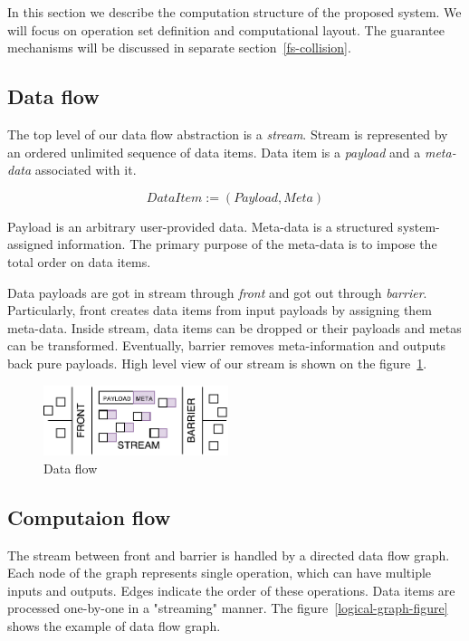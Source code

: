 
\label {fs-data-flow}
In this section we describe the computation structure of the proposed system. We will focus on operation set definition and computational layout. The guarantee mechanisms will be discussed in separate section~\ref{fs-collision}.

\subsection{Data flow}

The top level of our data flow abstraction is a {\it stream}. Stream is represented by an ordered unlimited sequence of data items. Data item is a {\it payload} and a {\it meta-data} associated with it. 

\[DataItem := (Payload, Meta)\]

Payload is an arbitrary user-provided data. Meta-data is a structured system-assigned information. The primary purpose of the meta-data is to impose the total order on data items. 

Data payloads are got in stream through {\it front} and got out through {\it barrier}. Particularly, front creates data items from input payloads by assigning them meta-data. Inside stream, data items can be dropped or their payloads and metas can be transformed. Eventually, barrier removes meta-information and outputs back pure payloads. High level view of our stream is shown on the figure~\ref{stream}.

\begin{figure}[htbp]
  \centering
  \includegraphics[width=0.48\textwidth]{pics/stream}
  \caption{Data flow}
  \label {stream}
\end{figure}

\subsection{Computaion flow}

The stream between front and barrier is handled by a directed data flow graph. Each node of the graph represents single operation, which can have multiple inputs and outputs. Edges indicate the order of these operations. Data items are processed one-by-one in a "streaming" manner. The figure~\ref{logical-graph-figure} shows the example of data flow graph.

